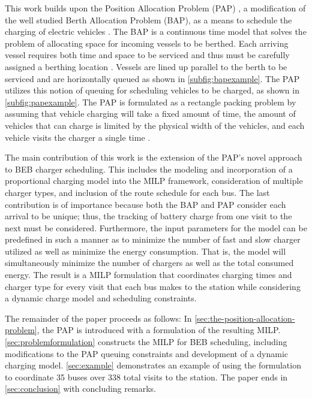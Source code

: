 \documentclass[utf8]{FrontiersinHarvard}
\let\cite\citep                                       %
\newcommand{\A}{35 }                                                            %
\newcommand{\N}{338 }                                                           %
\begin{document}
This work builds upon the Position Allocation Problem (PAP) \cite{qarebagh-2019-optim-sched}, a modification of the
well studied Berth Allocation Problem (BAP), as a means to schedule the charging of electric vehicles
\cite{buhrkal-2011-model-discr,frojan-2015-contin-berth,imai-2001-dynam-berth}. The BAP is a continuous time model
that solves the problem of allocating space for incoming vessels to be berthed. Each arriving vessel requires both time
and space to be serviced and thus must be carefully assigned a berthing location \cite{imai-2001-dynam-berth}. Vessels
are lined up parallel to the berth to be serviced and are horizontally queued as shown in \autoref{subfig:bapexample}.
The PAP utilizes this notion of queuing for scheduling vehicles to be charged, as shown in \autoref{subfig:papexample}.
The PAP is formulated as a rectangle packing problem by assuming that vehicle charging will take a fixed amount of time,
the amount of vehicles that can charge is limited by the physical width of the vehicles, and each vehicle visits the
charger a single time \cite{qarebagh-2019-optim-sched}.

The main contribution of this work is the extension of the PAP's novel approach to BEB charger scheduling. This includes
the modeling and incorporation of a proportional charging model into the MILP framework, consideration of multiple
charger types, and inclusion of the route schedule for each bus. The last contribution is of importance because both the
BAP and PAP consider each arrival to be unique; thus, the tracking of battery charge from one visit to the next must be
considered. Furthermore, the input parameters for the model can be predefined in such a manner as to minimize the number
of fast and slow charger utilized as well as minimize the energy consumption. That is, the model will simultaneously
minimize the number of chargers as well as the total consumed energy. The result is a MILP formulation that coordinates
charging times and charger type for every visit that each bus makes to the station while considering a dynamic charge
model and scheduling constraints.

The remainder of the paper proceeds as follows: In \autoref{sec:the-position-allocation-problem}, the PAP is introduced
with a formulation of the resulting MILP. \autoref{sec:problemformulation} constructs the MILP for BEB scheduling,
including modifications to the PAP queuing constraints and development of a dynamic charging model.
\autoref{sec:example} demonstrates an example of using the formulation to coordinate \A buses over \N total visits to
the station. The paper ends in \autoref{sec:conclusion} with concluding remarks.
\end{document}
